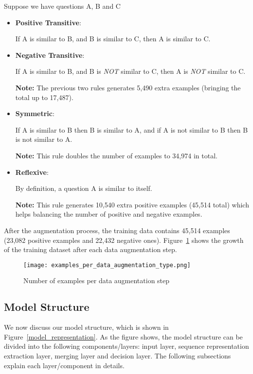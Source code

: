 \documentclass[11pt,a4paper]{article}
\begin{document}
Suppose we have questions A, B and C
\begin{itemize}
  \item \textbf{Positive Transitive}:
  
  If A is similar to B, and B is similar to C, then A is similar to C.
  \item \textbf{Negative Transitive}:
  
  If A is similar to B, and B is \textit{NOT} similar to C, then A is \textit{NOT} similar to C.
  
  \textbf{Note:} The previous two rules generates 5,490 extra examples (bringing the total up to 17,487).
  \item \textbf{Symmetric}:
  
  If A is similar to B then B is similar to A, and if A is not similar to B then B is not similar to A.
  
  \textbf{Note:} This rule doubles the number of examples to 34,974 in total.
  \item \textbf{Reflexive}:
  
  By definition, a question A is similar to itself.
  
  \textbf{Note:} This rule generates 10,540 extra positive examples (45,514 total) which helps balancing the number of positive and negative examples.
\end{itemize}

After the augmentation process, the training data contains 45,514 examples (23,082 positive examples and 22,432 negative ones). Figure~\ref{examples_per_data_augmentation_type} shows the growth of the training dataset after each data augmentation step.

\begin{figure}
    \centering
    \texttt{[image: examples\_per\_data\_augmentation\_type.png]}
    \caption{Number of examples per data augmentation step}
    \label{examples_per_data_augmentation_type}
\end{figure}

\subsection{Model Structure}
\label{sec:model_structure}

We now discuss our model structure, which is shown in Figure~\ref{model_representation}. As the figure shows, the model structure can be divided into the following components/layers: input layer, sequence representation extraction layer, merging layer and decision layer. The following subsections explain each layer/component in details.
\end{document}
